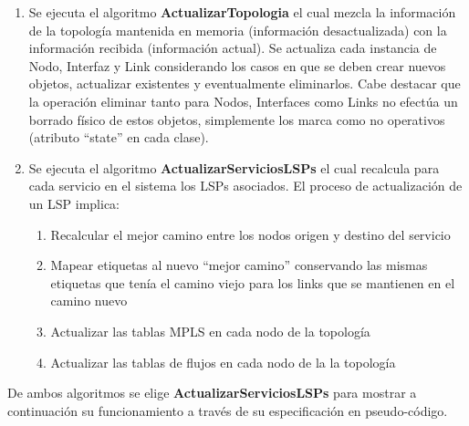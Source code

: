 \begin{enumerate}
\item Se ejecuta el algoritmo \textbf{ActualizarTopologia} el cual mezcla la informaci\'on de la topolog\'ia mantenida en memoria (informaci\'on desactualizada) con la informaci\'on recibida  
 (informaci\'on actual). Se actualiza cada instancia de Nodo, Interfaz y Link considerando los casos en que se deben crear nuevos objetos, actualizar existentes y eventualmente eliminarlos. Cabe destacar que la operaci\'on eliminar tanto para Nodos, Interfaces como Links no efectúa un borrado f\'isico de estos objetos, simplemente los marca como no operativos (atributo “state” en cada clase).  

\item Se ejecuta el algoritmo \textbf{ActualizarServiciosLSPs} el cual recalcula para cada servicio en el sistema los LSPs asociados. El proceso de actualización de un LSP implica:

\begin{enumerate}
\item Recalcular el mejor camino entre los nodos origen y destino del servicio
\item Mapear etiquetas al nuevo “mejor camino” conservando las mismas etiquetas que ten\'ia el camino viejo para los links que se mantienen en el camino nuevo
\item Actualizar las tablas MPLS en cada nodo de la topolog\'ia
\item Actualizar las tablas de flujos en cada nodo de la la topolog\'ia  
\end{enumerate}

\end{enumerate}    

De ambos algoritmos se elige \textbf{ActualizarServiciosLSPs} para mostrar a continuaci\'on su funcionamiento a trav\'es de su especificaci\'on en pseudo-c\'odigo.
 
